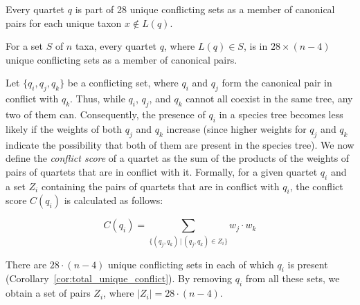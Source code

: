 \documentclass[runningheads]{llncs}
\begin{document}
\vspace{-15pt}

\begin{corollary}
\label{cor:unique-conflict}
Every quartet $q$ is part of 28 unique conflicting sets as a member of canonical pairs for each unique taxon $x \notin L(q) $.
\end{corollary}


\vspace{-15pt}

\begin{corollary}
\label{cor:total_unique_conflict}
For a set $S$ of $n$ taxa, every quartet $q$, where $L(q) \in S$, is in $28 \times (n-4)$ unique conflicting sets as a member of canonical pairs.
\end{corollary}

\vspace{-8pt}

Let $ \{q_i, q_j, q_k \} $ be a conflicting set, where $q_i$ and $q_j$ form the canonical pair in conflict with $q_k$. Thus, while $q_i$, $q_j$, and $q_k$ cannot all coexist in the same tree, any two of them can. Consequently, the presence of $q_i$ in a species tree becomes less likely if the weights of both $q_j$ and $q_k$ increase (since higher weights for $q_j$ and $q_k$ indicate the possibility that both of them are present in the species tree). We now define the \textit{conflict score} of a quartet as the sum of the products of the weights of pairs of quartets that are in conflict with it. Formally, for a given quartet $q_i$ and a set $Z_i$ containing the pairs of quartets that are in conflict with $q_i$, the conflict score $C(q_i)$ is calculated as follows:

\vspace{-10pt}
\begin{equation}
\label{eq:conflict_score}
C(q_i) = \sum_{\{(q_j, q_k) \,|\, (q_j, q_k) \in Z_i\}} w_j \cdot w_k
\end{equation}

There are $28 \cdot (n - 4)$ unique conflicting sets in each of which $q_i$ is present (Corollary~\ref{cor:total_unique_conflict}). By removing  $q_i$ from all these sets, we obtain a set of pairs $Z_i$, where $|Z_i| = 28 \cdot (n-4)$. %
\end{document}
